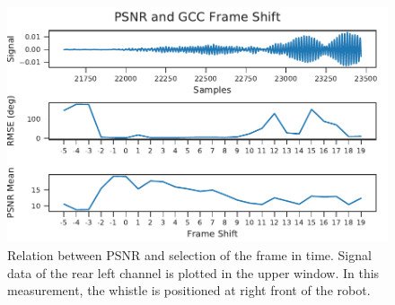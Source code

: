\begin{figure}[ht]
	\centering
	\includegraphics[]{figures/evaluation/gcc_frame_shift}
	\caption{
		Relation between \ac{PSNR}
		and selection of the frame in time. Signal data
		of the rear left channel is plotted in the upper window.
		In this measurement, the whistle is positioned at right front
		of the robot.
	}
	\label{fig:04_psnr2FrameShift}
\end{figure}

